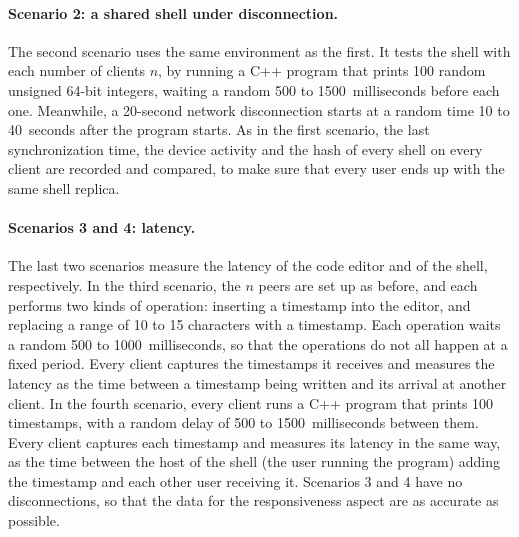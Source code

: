 \paragraph{Scenario 2: a shared shell under disconnection.} The second scenario uses the same environment as the first. It tests the shell with each number of clients $n$, by running a C++ program that prints 100 random unsigned 64-bit integers, waiting a random 500 to 1500~milliseconds before each one. Meanwhile, a 20-second network disconnection starts at a random time 10 to 40~seconds after the program starts. As in the first scenario, the last synchronization time, the device activity and the hash of every shell on every client are recorded and compared, to make sure that every user ends up with the same shell replica.

\paragraph{Scenarios 3 and 4: latency.} The last two scenarios measure the latency of the code editor and of the shell, respectively. In the third scenario, the $n$ peers are set up as before, and each performs two kinds of operation: inserting a timestamp into the editor, and replacing a range of 10 to 15 characters with a timestamp. Each operation waits a random 500 to 1000~milliseconds, so that the operations do not all happen at a fixed period. Every client captures the timestamps it receives and measures the latency as the time between a timestamp being written and its arrival at another client. In the fourth scenario, every client runs a C++ program that prints 100 timestamps, with a random delay of 500 to 1500~milliseconds between them. Every client captures each timestamp and measures its latency in the same way, as the time between the host of the shell (the user running the program) adding the timestamp and each other user receiving it. Scenarios 3 and 4 have no disconnections, so that the data for the responsiveness aspect are as accurate as possible.
